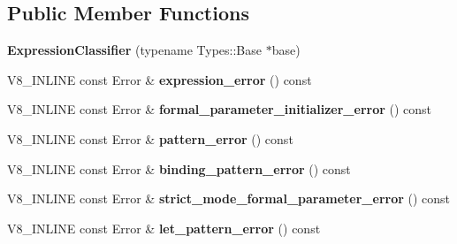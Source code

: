 \subsection*{Public Member Functions}
\begin{DoxyCompactItemize}
\item 
\mbox{\label{classv8_1_1internal_1_1ExpressionClassifier_af267a88d1f7dfec1f377a44f991b1e36}} 
{\bfseries Expression\+Classifier} (typename Types\+::\+Base $\ast$base)
\item 
\mbox{\label{classv8_1_1internal_1_1ExpressionClassifier_aa09c13d7b736e5260398cbd7ba164b10}} 
V8\+\_\+\+I\+N\+L\+I\+NE const Error \& {\bfseries expression\+\_\+error} () const
\item 
\mbox{\label{classv8_1_1internal_1_1ExpressionClassifier_ae659b4466edbde314bf74f18c4b379ec}} 
V8\+\_\+\+I\+N\+L\+I\+NE const Error \& {\bfseries formal\+\_\+parameter\+\_\+initializer\+\_\+error} () const
\item 
\mbox{\label{classv8_1_1internal_1_1ExpressionClassifier_ac9ff49cfa0381ac3bc53897168db8e91}} 
V8\+\_\+\+I\+N\+L\+I\+NE const Error \& {\bfseries pattern\+\_\+error} () const
\item 
\mbox{\label{classv8_1_1internal_1_1ExpressionClassifier_a1333c02b7b7f1637923460874b336546}} 
V8\+\_\+\+I\+N\+L\+I\+NE const Error \& {\bfseries binding\+\_\+pattern\+\_\+error} () const
\item 
\mbox{\label{classv8_1_1internal_1_1ExpressionClassifier_a855d9636e36382e75e91f493d5f29580}} 
V8\+\_\+\+I\+N\+L\+I\+NE const Error \& {\bfseries strict\+\_\+mode\+\_\+formal\+\_\+parameter\+\_\+error} () const
\item 
\mbox{\label{classv8_1_1internal_1_1ExpressionClassifier_ad9ec25791a17add58f47277971af222e}} 
V8\+\_\+\+I\+N\+L\+I\+NE const Error \& {\bfseries let\+\_\+pattern\+\_\+error} () const
\item 
\mbox{\label{classv8_1_1internal_1_1ExpressionClassifier_a7fa32a6f1cd664c9c1a0dc9eedf32dff}} 

\end{DoxyCompactItemize}
